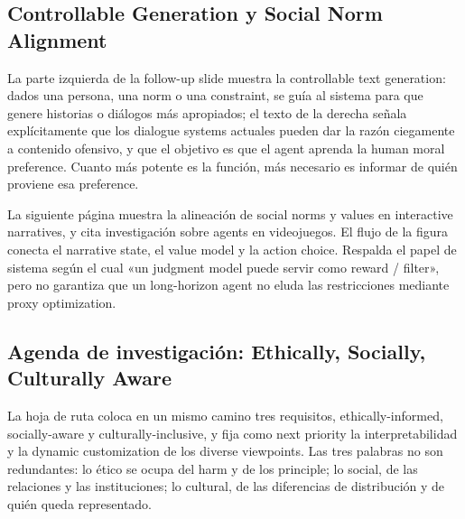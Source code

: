
\subsection{Controllable Generation y Social Norm Alignment}

La parte izquierda de la follow-up slide muestra la controllable text generation: dados una persona, una norm o una constraint, se guía al sistema para que genere historias o diálogos más apropiados; el texto de la derecha señala explícitamente que los dialogue systems actuales pueden dar la razón ciegamente a contenido ofensivo, y que el objetivo es que el agent aprenda la human moral preference. Cuanto más potente es la función, más necesario es informar de quién proviene esa preference.


La siguiente página muestra la alineación de social norms y values en interactive narratives, y cita investigación sobre agents en videojuegos. El flujo de la figura conecta el narrative state, el value model y la action choice. Respalda el papel de sistema según el cual «un judgment model puede servir como reward / filter», pero no garantiza que un long-horizon agent no eluda las restricciones mediante proxy optimization.


\subsection{Agenda de investigación: Ethically, Socially, Culturally Aware}

La hoja de ruta coloca en un mismo camino tres requisitos, ethically-informed, socially-aware y culturally-inclusive, y fija como next priority la interpretabilidad y la dynamic customization de los diverse viewpoints. Las tres palabras no son redundantes: lo ético se ocupa del harm y de los principle; lo social, de las relaciones y las instituciones; lo cultural, de las diferencias de distribución y de quién queda representado.

